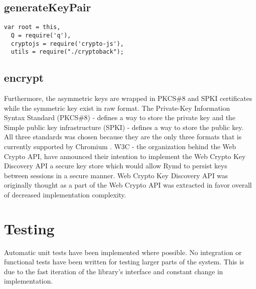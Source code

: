 \subsection{generateKeyPair}
\begin{Code}
\begin{lstlisting}[caption={Common database operations}, label={lst:api}]
var root = this,
  Q = require('q'),
  cryptojs = require('crypto-js'),
  utils = require("./cryptoback");
\end{lstlisting}
\end{Code}

\subsection{encrypt}
Furthermore, the asymmetric keys are wrapped in PKCS\#8 and SPKI certificates while the symmetric key exist in raw format.
The Private-Key Information Syntax Standard (PKCS\#8) -  defines a way to store the private key and the Simple public key infrastructure (SPKI) - defines a way to store the public key.
All three standards was chosen because they are the only three formats that is currently supported by Chromium \cite{ImplementedChromium:Online}.
W3C - the organization behind the Web Crypto API, have announced their intention to implement the Web Crypto Key Discovery API \cite{WebCryptoKeyDiscovery:Online} a secure key store which would allow Rymd to persist keys between sessions in a secure manner.
Web Crypto Key Discovery API was originally thought as a part of the Web Crypto API was extracted in favor overall of decreased implementation complexity.


\section{Testing}
\label{sec:testing}
Automatic unit tests have been implemented where possible. No integration or functional tests have been written for testing larger parts of the system. This is due to the fast iteration of the library's interface and constant change in implementation.
